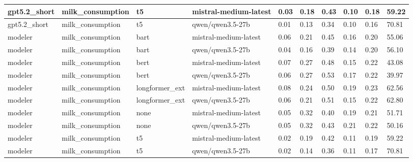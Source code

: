 \begin{tabular}{|l|l|l|l|l|l|l|l|l|l|}
 \hline
 gpt5.2\_short & milk\_consumption & t5 & mistral-medium-latest & 0.03 & 0.18 & 0.43 & 0.10 & 0.18 & 59.22 \\
 \hline
 gpt5.2\_short & milk\_consumption & t5 & qwen/qwen3.5-27b & 0.01 & 0.13 & 0.34 & 0.10 & 0.16 & 70.81 \\
 \hline
 modeler & milk\_consumption & bart & mistral-medium-latest & 0.06 & 0.21 & 0.45 & 0.16 & 0.20 & 55.06 \\
 \hline
 modeler & milk\_consumption & bart & qwen/qwen3.5-27b & 0.04 & 0.16 & 0.39 & 0.14 & 0.20 & 56.10 \\
 \hline
 modeler & milk\_consumption & bert & mistral-medium-latest & 0.07 & 0.27 & 0.48 & 0.15 & 0.22 & 43.08 \\
 \hline
 modeler & milk\_consumption & bert & qwen/qwen3.5-27b & 0.06 & 0.27 & 0.53 & 0.17 & 0.22 & 39.97 \\
 \hline
 modeler & milk\_consumption & longformer\_ext & mistral-medium-latest & 0.08 & 0.24 & 0.50 & 0.19 & 0.23 & 62.56 \\
 \hline
 modeler & milk\_consumption & longformer\_ext & qwen/qwen3.5-27b & 0.06 & 0.21 & 0.51 & 0.15 & 0.22 & 62.80 \\
 \hline
 modeler & milk\_consumption & none & mistral-medium-latest & 0.05 & 0.32 & 0.40 & 0.19 & 0.21 & 51.71 \\
 \hline
 modeler & milk\_consumption & none & qwen/qwen3.5-27b & 0.05 & 0.32 & 0.43 & 0.21 & 0.22 & 50.16 \\
 \hline
 modeler & milk\_consumption & t5 & mistral-medium-latest & 0.02 & 0.19 & 0.42 & 0.11 & 0.19 & 59.22 \\
 \hline
 modeler & milk\_consumption & t5 & qwen/qwen3.5-27b & 0.02 & 0.14 & 0.36 & 0.11 & 0.17 & 70.81 \\
\hline
\end{tabular}
